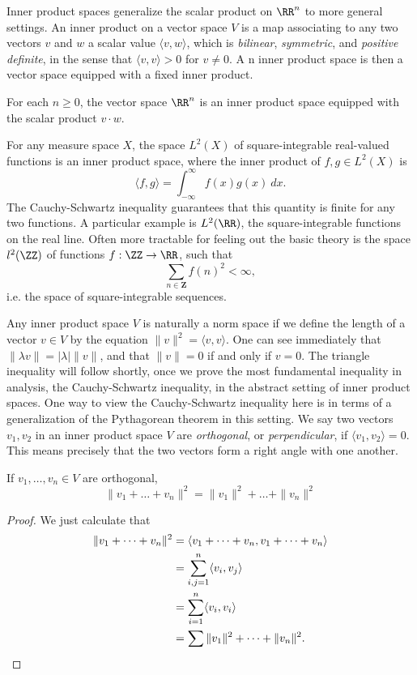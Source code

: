 Inner product spaces generalize the scalar product on $\RR^n$ to more general settings. An inner product on a vector space $V$ is a map associating to any two vectors $v$ and $w$ a scalar value $\langle v, w \rangle$, which is \emph{bilinear}, \emph{symmetric}, and \emph{positive definite}, in the sense that $\langle v, v \rangle > 0$ for $v \neq 0$. A n inner product space is then a vector space equipped with a fixed inner product.

\begin{example}
    For each $n \geq 0$, the vector space $\RR^n$ is an inner product space equipped with the scalar product $v \cdot w$.
\end{example}

\begin{example}
    For any measure space $X$, the space $L^2(X)$ of square-integrable real-valued functions is an inner product space, where the inner product of $f,g \in L^2(X)$ is
    \[ \langle f, g \rangle = \int_{-\infty}^\infty f(x) g(x)\ dx. \]
    The Cauchy-Schwartz inequality guarantees that this quantity is finite for any two functions. A particular example is $L^2(\RR)$, the square-integrable functions on the real line. Often more tractable for feeling out the basic theory is the space $l^2(\ZZ)$ of functions $f: \ZZ \to \RR$, such that
    \[ \sum_{n \in \mathbf{Z}} f(n)^2 < \infty, \]
    i.e. the space of square-integrable sequences.
\end{example}

Any inner product space $V$ is naturally a norm space if we define the length of a vector $v \in V$ by the equation $\| v \|^2 = \langle v, v \rangle$. One can see immediately that $\| \lambda v \| = |\lambda| \| v \|$, and that $\| v \| = 0$ if and only if $v = 0$. The triangle inequality will follow shortly, once we prove the most fundamental inequality in analysis, the Cauchy-Schwartz inequality, in the abstract setting of inner product spaces. One way to view the Cauchy-Schwartz inequality here is in terms of a generalization of the Pythagorean theorem in this setting. We say two vectors $v_1,v_2$ in an inner product space $V$ are \emph{orthogonal}, or \emph{perpendicular}, if $\langle v_1, v_2 \rangle = 0$. This means precisely that the two vectors form a right angle with one another.

\begin{theorem}
    If $v_1,\dots,v_n \in V$ are orthogonal,
    \[ \| v_1 + \dots + v_n \|^2 = \| v_1 \|^2 + \dots + \| v_n \|^2 \]
\end{theorem}
\begin{proof}
    We just calculate that
    \begin{align*}
        \| v_1 + \dots + v_n \|^2 &= \langle v_1 + \dots + v_n, v_1 + \dots + v_n \rangle\\
        &= \sum_{i,j = 1}^n \langle v_i, v_j \rangle\\
        &= \sum_{i = 1}^n \langle v_i, v_i \rangle\\
        &= \sum \| v_1 \|^2 + \dots + \| v_n \|^2. \qedhere
    \end{align*}
\end{proof}

